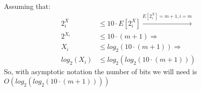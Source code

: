 \documentclass[11pt]{537homework}
\begin{document}
\subsection{}
Assuming that:
\begingroup
\allowdisplaybreaks
\begin{align*}
 2^X_i & \leq 10 \cdot E[2^X_i] \xrightarrow{E[2^X_i] = m+1, i=m} \\
 2^{X_i} & \leq 10 \cdot (m+1) \Longrightarrow \\
 X_i & \leq log_{2}(10 \cdot (m+1)) \Longrightarrow \\
 log_{2}(X_i) & \leq log_{2}(log_{2}(10 \cdot (m+1))) 
\end{align*}
So, with asymptotic notation the number of bits we will need is $O(log_{2}(log_{2}(10 \cdot (m+1))) )$
\subsection{}
\end{document}
